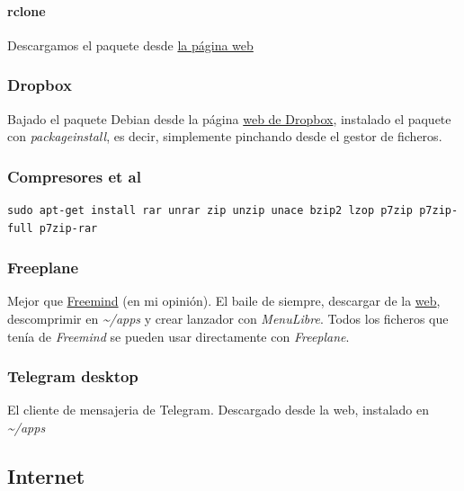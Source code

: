 \documentclass[12pt,spanish,]{scrartcl}
\let\oldparagraph\paragraph
\renewcommand{\paragraph}[1]{\oldparagraph{#1}\mbox{}}
\begin{document}
\hypertarget{rclone}{%
\paragraph{rclone}\label{rclone}}

Descargamos el paquete desde \href{https://rclone.org/}{la página web}

\hypertarget{dropbox}{%
\subsubsection{Dropbox}\label{dropbox}}

Bajado el paquete Debian desde la página
\href{https://www.dropbox.com/install-linux}{web de Dropbox}, instalado
el paquete con \emph{packageinstall}, es decir, simplemente pinchando
desde el gestor de ficheros.

\hypertarget{compresores-et-al}{%
\subsubsection{Compresores et al}\label{compresores-et-al}}

\begin{verbatim}
sudo apt-get install rar unrar zip unzip unace bzip2 lzop p7zip p7zip-full p7zip-rar
\end{verbatim}

\hypertarget{freeplane}{%
\subsubsection{Freeplane}\label{freeplane}}

Mejor que
\href{http://freemind.sourceforge.net/wiki/index.php/Main_Page}{Freemind}
(en mi opinión). El baile de siempre, descargar de la
\href{http://www.freeplane.org/}{web}, descomprimir en
\emph{\textasciitilde{}/apps} y crear lanzador con \emph{MenuLibre}.
Todos los ficheros que tenía de \emph{Freemind} se pueden usar
directamente con \emph{Freeplane}.

\hypertarget{telegram-desktop}{%
\subsubsection{Telegram desktop}\label{telegram-desktop}}

El cliente de mensajeria de Telegram. Descargado desde la web, instalado
en \emph{\textasciitilde{}/apps}

\hypertarget{internet}{%
\subsection{Internet}\label{internet}}
\end{document}
